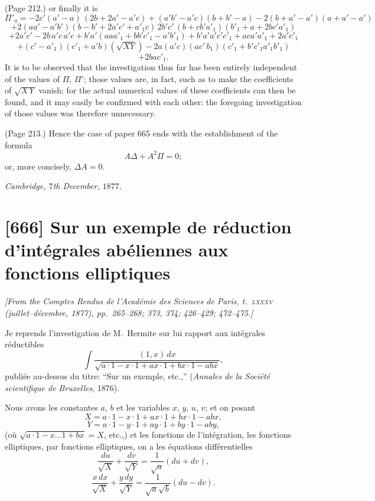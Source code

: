 \documentclass[11pt,a4paper]{article}
\theoremstyle{plain}
\theoremstyle{definition}
\begin{document}
\medskip

\noindent (Page 212.) or finally it is
\[
\Pi'_a = - 2 c' (a' - a)\,(2 b + 2 a' - a' c) + (a' b' - a' c)(b + b' - a) - 2(b + a' - a')(a + a' - a')
\]
\[
+ 2 (a a' - a' b')(b - b' + 2 a' c' + a'_1 c)\,2 b' c'\,(b + c b' a'_1)(b'_1 + a + 2 b c' a'_1)
\]
\[
+ 2 a' c' - 2 b\,a' c\,a' c + b' a' (a a a'_1 + b b' c'_1 - a' b'_1) + b' a' a' c' c'_1 + a c a' a'_1 + 2 a' c'_1
\]
\[
+ (c' - a'_1)(c'_1 + a' b)(\sqrt{X Y}) - 2 a (a' c)(a c'\,b_1)(c'_1 + b' c'_1 a'_1 b'_1)
\]
\[
+ 2 b a c'_1.
\]
It is to be observed that the investigation thus far has been entirely independent of the values of $\Pi$, $\Pi'$; those values are, in fact, such as to make the coefficients of $\sqrt{X\,Y}$ vanish; for the actual numerical values of these coefficients can then be found, and it may easily be confirmed with each other: the foregoing investigation of those values was therefore unnecessary.

\medskip

\noindent (Page 213.) Hence the case of paper 665 ends with the establishment of the formula
\[
A \Delta + A^2 \Pi = 0;
\]
or, more concisely, $\Delta A = 0$.

\bigskip

\noindent\textit{Cambridge, $7$th December, $1877$.}

\bigskip

\section{[666] Sur un exemple de r\'eduction d'int\'egrales ab\'eliennes aux fonctions elliptiques}
\label{sec:666}

\noindent\textit{[From the \emph{Comptes Rendus de l'Acad\'emie des Sciences de Paris}, t.~\textsc{lxxxv} (juillet--d\'ecembre, 1877), pp.~265--268; 373, 374; 426--429; 472--475.]}

\medskip

\noindent Je reprends l'investigation de M.~Hermite sur lui rapport aux int\'egrales r\'eductibles
\[
\int \frac{(1, x)\,dx}{\sqrt{a\cdot 1 - x \cdot 1 + ax\cdot 1 + bx\cdot 1 - abx}},
\]
publi\'ee au-dessus du titre: ``Sur un exemple, etc.,'' (\emph{Annales de la Soci\'et\'e scientifique de Bruxelles}, 1876).

Nous avons les constantes $a$, $b$ et les variables $x$, $y$, $u$, $v$; et on posant
\[
X = a\cdot 1 - x\cdot 1 + a x\cdot 1 + b x\cdot 1 - a b x,
\]
\[
Y = a\cdot 1 - y\cdot 1 + a y\cdot 1 + b y\cdot 1 - a b y,
\]
(o\`u $\sqrt{a\cdot 1 - x \ldots 1 + bx} = X$, etc.,) et les fonctions de l'int\'egration, les fonctions elliptiques, par fonctions elliptiques, on a les \'equations diff\'erentielles
\[
\frac{du}{\sqrt{X}} + \frac{dv}{\sqrt{Y}} = \frac{1}{\sqrt{a}} (du + dv),
\]
\[
\frac{x\,dx}{\sqrt{X}} + \frac{y\,dy}{\sqrt{Y}} = \frac{1}{\sqrt{a}\sqrt{b}} (du - dv).
\]
\end{document}
